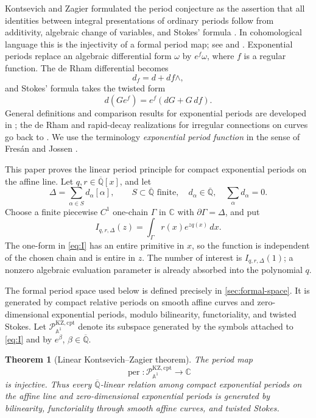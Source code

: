 \documentclass[11pt]{article}
\numberwithin{equation}{section}
\newtheorem{theorem}{Theorem}[section]
\theoremstyle{definition}
\theoremstyle{remark}
\newcommand{\C}{\mathbb C}
\newcommand{\Qbar}{\overline{\mathbb Q}}
\newcommand{\Aone}{\mathbb A^1}
\newcommand{\per}{\operatorname{per}}
\newcommand{\Pcal}{\mathcal P}
\begin{document}
Kontsevich and Zagier formulated the period conjecture as the assertion that
all identities between integral presentations of ordinary periods follow
from additivity, algebraic change of variables, and Stokes' formula
\cite{KontsevichZagier}.  In cohomological language this is the injectivity
of a formal period map; see
\cite[Chapters~12--13]{HuberMullerStach} and
\cite{CressonViuSos}.  Exponential periods replace an algebraic differential
form $\omega$ by $e^f\omega$, where $f$ is a regular function.  The de Rham
differential becomes
\[
  d_f=d+df\wedge,
\]
and Stokes' formula takes the twisted form
\[
  d(Ge^f)=e^f(dG+G\,df).
\]
General definitions and comparison results for exponential periods are
developed in \cite{CommelinHabeggerHuber,FresanJossenExp}; the de Rham and rapid-decay
realizations for irregular connections on curves go back to
\cite{BlochEsnault,HienFlat}.  We use the terminology \emph{exponential
period function} in the sense of Fres\'an and Jossen
\cite{FresanJossen}.

This paper proves the linear period principle for compact exponential
periods on the affine line.  Let $q,r\in\Qbar[x]$, and let
\[
  \Delta=\sum_{\alpha\in S}d_\alpha[\alpha],
  \qquad S\subset\Qbar\text{ finite},\quad
  d_\alpha\in\Qbar,\quad \sum_\alpha d_\alpha=0.
\]
Choose a finite piecewise $C^1$ one-chain $\Gamma$ in $\C$ with
$\partial\Gamma=\Delta$, and put
\begin{equation}\label{eq:I}
  I_{q,r,\Delta}(z)=\int_\Gamma r(x)e^{zq(x)}\,dx.
\end{equation}
The one-form in \eqref{eq:I} has an entire primitive in $x$, so the function
is independent of the chosen chain and is entire in $z$.  The number of
interest is $I_{q,r,\Delta}(1)$; a nonzero algebraic evaluation parameter is
already absorbed into the polynomial $q$.

The formal period space used below is defined precisely in
\cref{sec:formal-space}.  It is generated by compact relative periods on
smooth affine curves and zero-dimensional exponential periods, modulo bilinearity, functoriality,
and twisted Stokes.  Let
$\Pcal_{\Aone}^{\mathrm{KZ,cpt}}$ denote its subspace generated by the
symbols attached to \eqref{eq:I} and by $e^\beta$, $\beta\in\Qbar$.

\begin{theorem}[Linear Kontsevich--Zagier theorem]\label{thm:main}
The period map
\[
  \per:\Pcal_{\Aone}^{\mathrm{KZ,cpt}}\longrightarrow\C
\]
is injective.  Thus every $\Qbar$-linear relation among compact exponential
periods on the affine line and zero-dimensional exponential periods is generated by bilinearity,
functoriality through smooth affine curves, and twisted Stokes.
\end{theorem}
\end{document}
